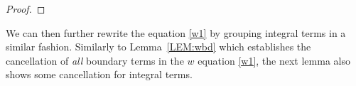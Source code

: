 \documentclass[%
11pt,  reqno]{amsart}
\makeatletter
\newcommand{\5}{\textup{V}}
\newcommand{\wt}{\widetilde}
\theoremstyle{remark}
\newcommand{\bul}{\bullet}
\newcommand{\TT}{\mathcal{T}}
\newcommand{\Tr}{\mathrm{T}}
\newcommand{\ff}{\mathfrak{f}}
\def\<#1>{\csname MH@symb@#1\endcsname}
\numberwithin{equation}{section}
\numberwithin{theorem}{section}
\newcommand{\BB}{\mathrm{B}}
\newcommand{\D}{\mathrm{D}}
\makeatother
\begin{document}
\begin{proof}





\end{proof}



We can then further rewrite the equation \eqref{w1} by grouping integral terms in a similar fashion. Similarly to Lemma~\ref{LEM:wbd} which establishes the cancellation of \textit{all} boundary terms in the $w$ equation \eqref{w1}, the next lemma also shows some cancellation for integral terms. 
\end{document}
